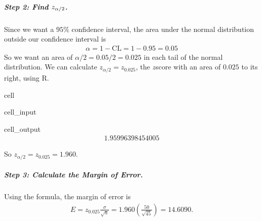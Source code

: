 \documentclass[letterpaper,10pt,english]{jupyterBook}
\begin{document}
\subparagraph{Step 2: Find \protect\(z_{\alpha/2}\protect\).}
\label{\detokenize{Ch5 Confidence Intervals/5.1 Estimating Population Means (Sigma Known):step-2-find-z-alpha-2}}
\sphinxAtStartPar
Since we want a \(95\%\) confidence interval, the area under the normal distribution outside our confidence interval is
\begin{equation*}
\begin{split} \alpha = 1 - \text{CL} = 1 - 0.95 = 0.05 \end{split}
\end{equation*}
\sphinxAtStartPar
So we want an area of \(\alpha/2 = 0.05/2 = 0.025\) in each tail of the normal distribution. We can calculate \(z_{\alpha/2} = z_{0.025}\), the \(z\)\sphinxhyphen{}score with an area of \(0.025\) to its right, using R.

\begin{sphinxuseclass}{cell}\begin{sphinxVerbatimInput}

\begin{sphinxuseclass}{cell_input}
\begin{sphinxVerbatim}[commandchars=\\\{\}]
\end{sphinxVerbatim}

\end{sphinxuseclass}\end{sphinxVerbatimInput}
\begin{sphinxVerbatimOutput}

\begin{sphinxuseclass}{cell_output}\begin{equation*}
\begin{split}1.95996398454005\end{split}
\end{equation*}
\end{sphinxuseclass}\end{sphinxVerbatimOutput}

\end{sphinxuseclass}
\sphinxAtStartPar
So \(z_{\alpha/2} = z_{0.025} = 1.960\).


\subparagraph{Step 3: Calculate the Margin of Error.}
\label{\detokenize{Ch5 Confidence Intervals/5.1 Estimating Population Means (Sigma Known):step-3-calculate-the-margin-of-error}}
\sphinxAtStartPar
Using the formula, the margin of error is
\begin{equation*}
\begin{split} E = z_{0.025} \frac{\sigma}{\sqrt{n}} = 1.960\left(\frac{50}{\sqrt{45}}\right) = 14.6090. \end{split}
\end{equation*}
\end{document}
